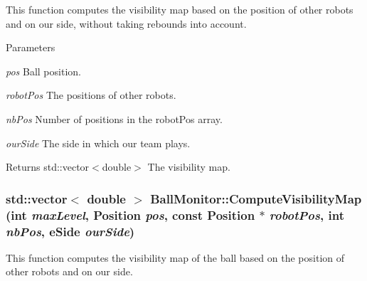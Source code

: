 This function computes the visibility map based on the position of other robots and on our side, without taking rebounds into account. 


\begin{DoxyParams}{Parameters}
\item[{\em pos}]Ball position. \item[{\em robotPos}]The positions of other robots. \item[{\em nbPos}]Number of positions in the robotPos array. \item[{\em ourSide}]The side in which our team plays. \end{DoxyParams}
\begin{DoxyReturn}{Returns}
std::vector$<$double$>$ The visibility map. 
\end{DoxyReturn}
\hypertarget{classBallMonitor_a0d2ef73ba2b0573021c800c311e08245}{
\subsubsection[{ComputeVisibilityMap}]{\setlength{\rightskip}{0pt plus 5cm}std::vector$<$ double $>$ BallMonitor::ComputeVisibilityMap (int {\em maxLevel}, \/  Position {\em pos}, \/  const Position $\ast$ {\em robotPos}, \/  int {\em nbPos}, \/  eSide {\em ourSide})}}
\label{classBallMonitor_a0d2ef73ba2b0573021c800c311e08245}


This function computes the visibility map of the ball based on the position of other robots and on our side. 


